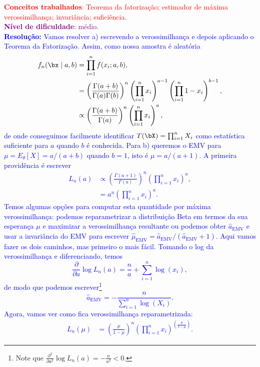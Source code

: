 \textcolor{red}{\textbf{Conceitos trabalhados}: Teorema da fatorização; estimador de máxima verossimilhança; invariância; suficiência.}\\ \textcolor{purple}{\textbf{Nível de dificuldade}: médio.}\\
\textcolor{blue}{
\textbf{Resolução:}
Vamos resolver a) escrevendo a verossimilhança e depois aplicando o Teorema da Fatorização.
Assim, como nossa amostra é aleatória
\begin{align*}
    f_n(\bx \mid a, b) &= \prod_{i=1}^n f(x_i; a, b),\\
    & = \left(\frac{\Gamma(a + b)}{\Gamma(a)\Gamma(b)}\right)^n  \left(\prod_{i=1}^n x_i\right)^{a-1} \left(\prod_{i=1}^n 1-x_i\right)^{b-1},\\
    &\propto \left(\frac{\Gamma(a + b)}{\Gamma(a)}\right)^n\left(\prod_{i=1}^n x_i\right)^{a} ,
\end{align*}
de onde conseguimos facilmente identificar $T(\bX) = \prod_{i=1}^n X_i$ como estatística suficiente para $a$ quando $b$ é conhecida.
Para b) queremos o EMV para $\mu = E_\theta[X] = a/(a+b)$ quando $b=1$, isto é $\mu = a/(a+1)$.
A primeira providência é escrever 
\begin{align*}
    L_n(a) &\propto \left(\frac{\Gamma(a + 1)}{\Gamma(a)}\right)^n\left(\prod_{i=1}^n x_i\right)^{a},\\
    &= a^n \left(\prod_{i=1}^n x_i\right)^{a}.
\end{align*}
Temos algumas opções para computar esta quantidade por máxima verossimilhança: podemos reparametrizar a distribuição Beta em termos da sua esperança $\mu$ e maximizar a verossimilhança resultante ou podemos obter $\hat{a}_{\textrm{EMV}}$ e usar a invariância do EMV para escrever $\hat{\mu}_{\textrm{EMV}} = \hat{a}_{\textrm{EMV}}/(\hat{a}_{\textrm{EMV}} +1)$.
Aqui vamos fazer os dois caminhos, mas primeiro o mais fácil.
Tomando o log da verossimilhança e diferenciando, temos
\begin{equation*}
    \frac{\partial}{\partial a}\log L_n(a) = \frac{n}{a} + \sum_{i=1}^n \log(x_i),
\end{equation*}
de modo que podemos escrever\footnote{Note que $ \frac{\partial^2}{\partial a^2}\log L_n(a) = -\frac{n}{a^2} < 0$.}
\begin{equation*}
    \hat{a}_{\textrm{EMV}} = - \frac{n}{\sum_{i=1}^n \log(X_i)}.
\end{equation*}
Agora, vamos ver como fica verossimilhança reparametrizada:
\begin{align*}
           L_n(\mu) &= \left(\frac{\mu}{1-\mu}\right)^n \left(\prod_{i=1}^n x_i\right)^{\left(\frac{\mu}{1-\mu}\right)}.

\end{align*}}
